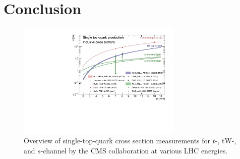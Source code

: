 \documentclass{PoS}
\begin{document}
\section{Conclusion}

\begin{figure}[htbp]
\begin{center}
\includegraphics[width=0.7\textwidth]{figures/singletop_sqrts.pdf}
\caption{Overview of single-top-quark cross section measurements for $t$-, tW-, and $s$-channel by the CMS collaboration at various LHC energies.}
\end{center}
\end{figure}

\clearpage
\end{document}
